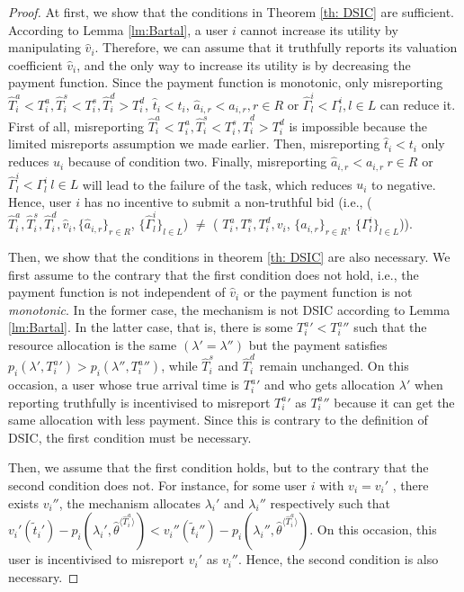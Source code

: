 \documentclass[11pt]{phdthesis}
\begin{document}
\begin{proof}
    At first, we show that the conditions in Theorem \ref{th: DSIC} are sufficient. According to Lemma \ref{lm:Bartal}, a user $ i $ cannot increase its utility by manipulating $\hat{v}_i$. Therefore, we can assume that it truthfully reports its valuation coefficient $\hat{v}_i$, and the only way to increase its utility is by decreasing the payment function. Since the payment function is monotonic, only misreporting $\hat{T}_i^a < T_i^a, \hat{T}_i^s < T_i^s, \hat{T}_i^d > T_i^d$, $ \hat{t}_i < t_i $, $ \hat{a}_{i,r}  <  a_{i,r}, r \in R  $ or $   \hat{\Gamma}_l^i  <  \Gamma_l^i , l \in L  $ can reduce it. First of all, misreporting $\hat{T}_i^a < T_i^a, \hat{T}_i^s < T_i^s, \hat{T}_i^d > T_i^d$ is impossible because the limited misreports assumption we made earlier. Then, misreporting $ \hat{t}_i < t_i $ only reduces $ u_i $ because of condition two. Finally, misreporting $ \hat{a}_{i,r}  <  a_{i,r} \ r \in R  $ or $   \hat{\Gamma}_l^i  <  \Gamma_l^i \  l \in L  $ will lead to the failure of the task, which reduces $ u_i $ to negative. Hence, user $ i $ has no incentive to submit a non-truthful bid (i.e.,  ($\hat{T}_i^a,\hat{T}_i^s,\hat{T}_i^d, \hat{v}_i, \{ \hat{a}_{i,r} \}_{r \in R} $, $ \{ \hat{\Gamma}_l^i \}_{l \in L} $) $ \neq $ ( $T_i^a, T_i^s, T_i^d, v_i $, $ \{ a_{i,r} \}_{r \in R} $, $ \{ \Gamma_l^i \}_{l \in L} $)).
    
    Then, we show that the conditions in theorem \ref{th: DSIC} are also necessary. We first assume to the contrary that the first condition does not hold, i.e., the payment function is not independent of $\hat{v}_i$ or the payment function is not \textit{monotonic}. In the former case, the mechanism is not DSIC according to Lemma \ref{lm:Bartal}. In the latter case, that is, there is some ${T_i^a}' < {T_i^a}''$ such that the resource allocation is the same $( \lambda' = \lambda'' )$ but the payment satisfies $p_i(\lambda', {T_i^a}') > p_i(\lambda'', {T_i^a}'')$, while $\hat{T}_i^s$ and $\hat{T}_i^d$ remain unchanged. On this occasion, a user whose true arrival time is ${T_i^a}'$ and who gets allocation $ \lambda' $ when reporting truthfully is incentivised to misreport ${T_i^a}'$ as ${T_i^a}''$ because it can get the same allocation with less payment. Since this is contrary to the definition of DSIC, the first condition must be necessary.
    
    Then, we assume that the first condition holds, but to the contrary that the second condition does not. For instance, for some user $ i $ with $ v_i = v_i'$ , there exists $v_i''$, the mechanism allocates $\lambda_i'$ and $\lambda_i''$ respectively such that $v_i' (\tilde{t}_i') - p_i(\lambda_i', \hat{\theta}^{\langle \hat{T}_i^a \rangle}) < v_i'' (\tilde{t}_i'') - p_i(\lambda_i'', \hat{\theta}^{\langle \hat{T}_i^a \rangle}) $. On this occasion, this user is incentivised to misreport  $v_i'$ as $ v_i'' $. Hence, the second condition is also necessary.
    

\end{proof}
\end{document}
